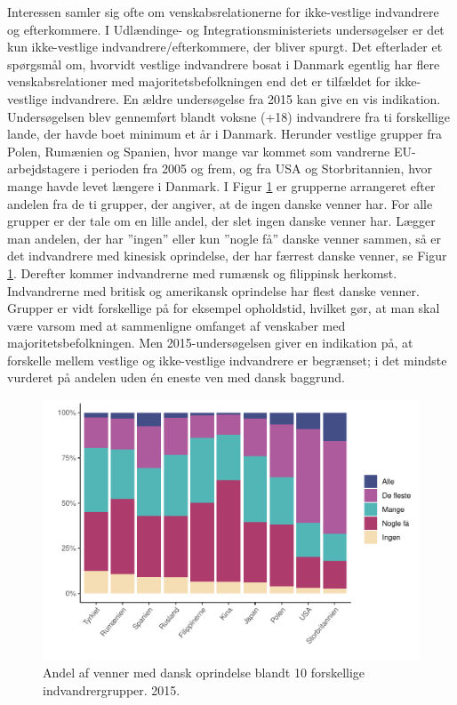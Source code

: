 \documentclass[
]{book}
\begin{document}
Interessen samler sig ofte om venskabsrelationerne for ikke-vestlige indvandrere og efterkommere. I Udlændinge- og Integrationsministeriets undersøgelser er det kun ikke-vestlige indvandrere/efterkommere, der bliver spurgt. Det efterlader et spørgsmål om, hvorvidt vestlige indvandrere bosat i Danmark egentlig har flere venskabsrelationer med majoritetsbefolkningen end det er tilfældet for ikke-vestlige indvandrere. En ældre undersøgelse fra 2015 kan give en vis indikation. Undersøgelsen blev gennemført blandt voksne (+18) indvandrere fra ti forskellige lande, der havde boet minimum et år i Danmark. Herunder vestlige grupper fra Polen, Rumænien og Spanien, hvor mange var kommet som vandrerne EU-arbejdstagere i perioden fra 2005 og frem, og fra USA og Storbritannien, hvor mange havde levet længere i Danmark. I Figur \ref{fig:fig-6-3} er grupperne arrangeret efter andelen fra de ti grupper, der angiver, at de ingen danske venner har. For alle grupper er der tale om en lille andel, der slet ingen danske venner har. Lægger man andelen, der har ''ingen'' eller kun ''nogle få'' danske venner sammen, så er det indvandrere med kinesisk oprindelse, der har færrest danske venner, se Figur \ref{fig:fig-6-3}. Derefter kommer indvandrerne med rumænsk og filippinsk herkomst. Indvandrerne med britisk og amerikansk oprindelse har flest danske venner. Grupper er vidt forskellige på for eksempel opholdstid, hvilket gør, at man skal være varsom med at sammenligne omfanget af venskaber med majoritetsbefolkningen. Men 2015-undersøgelsen giver en indikation på, at forskelle mellem vestlige og ikke-vestlige indvandrere er begrænset; i det mindste vurderet på andelen uden én eneste ven med dansk baggrund.

\begin{figure}
\includegraphics[width=1\linewidth]{en-befolkning-blander-sig_files/figure-latex/fig-6-3-1} \caption{Andel af venner med dansk oprindelse blandt 10 forskellige indvandrergrupper. 2015.}\label{fig:fig-6-3}
\end{figure}
\end{document}
